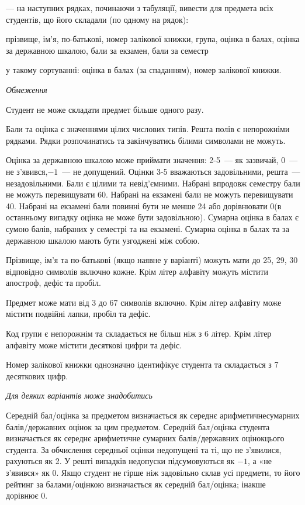 \documentclass[11pt, ukrainian]{article}
\begin{document}
{\noindent}--- на наступних рядках, починаючи з табуляції, вивести для предмета всіх студентів, що його складали (по одному на рядок):\par
прізвище, ім’я, по-батькові, номер залікової книжки, група, оцінка в балах, оцінка за державною шкалою, бали за екзамен, бали за семестр

{\noindent}у такому сортуванні: оцінка в балах (за спаданням), номер залікової книжки.


\bigskip\textit{Обмеження}

Студент не може складати предмет більше одного разу.

Бали та оцінка є значеннями цілих числових типів. Решта полів є непорожніми рядками.
Рядки розпочинатись та закінчуватись білими символами не можуть.

Оцінка за державною шкалою може приймати значення: 2-5~--- як зазвичай, 0~--- не з’явився,$-1$~--- не допущений. 
Оцінки 3-5 вважаються задовільними, решта~--- незадовільними. 
Бали є цілими та невід’ємними.
Набрані впродовж семестру бали не можуть перевищувати 60. 
Набрані на екзамені бали не можуть перевищувати 40. 
Набрані на екзамені бали повинні бути не менше 24 або дорівнювати 0(в останньому випадку оцінка не може бути задовільною). 
Сумарна оцінка в балах є сумою балів, набраних у семестрі та на екзамені.
Сумарна оцінка в балах та за державною шкалою мають бути узгоджені між собою.

Прізвище, ім’я та по-батькові (якщо наявне у варіанті) можуть мати до 25, 29, 30 відповідно символів включно кожне. 
Крім літер алфавіту можуть містити апостроф, дефіс та пробіл.

Предмет може мати від 3 до 67 символів включно. 
Крім літер алфавіту може містити подвійні лапки, пробіл та дефіс.

Код групи є непорожнім та складається не більш ніж з 6 літер. 
Крім літер алфавіту може містити десяткові цифри та дефіс.


Номер залікової книжки однозначно ідентифікує студента та складається з 7 десяткових цифр. 

\bigskip\textit{Для деяких варіантів може знадобитись}

Середній бал/оцінка за предметом визначається як середнє арифметичнесумарних балів/державних оцінок за цим предметом. 
Середній бал/оцінка студента визначається як середнє арифметичне сумарних балів/державних оцінокцього студента. 
За обчислення середньої оцінки недопущені та ті, що не з’явилися, рахуються як 2.
У решті випадків недопуски підсумовуються як $-1$, а «не з’явився» як 0.
Якщо студент не гірше ніж задовільно склав усі предмети, 
то його рейтинг за балами/оцінкою визначається як середній бал/оцінка; інакше дорівнює 0.
\end{document}

